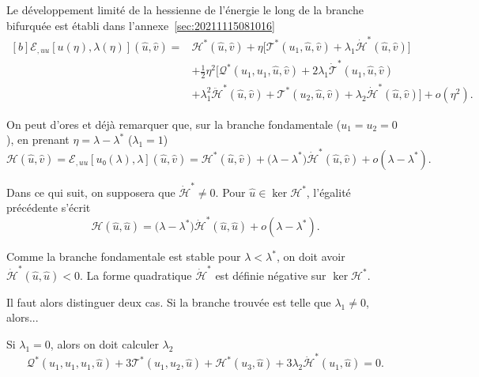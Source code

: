 \documentclass[12pt, final]{amsart}
\begin{document}
Le développement limité de la hessienne de l'énergie le long de la
branche bifurquée est établi dans l'annexe~\ref{sec:20211115081016}
\begin{equation}
  \label{eq:20211115082025}
  \begin{aligned}[b]
    ℰ_{,uu}[u(η), \lambda(η)](\hat{u}, \hat{v})
    ={}&\mathcal H^\ast(\hat{u}, \hat{v})
    +η\bigl[\mathcal T^\ast(u_1, \hat{u}, \hat{v})
    +\lambda_1\dot{\mathcal H}^\ast(\hat{u}, \hat{v})\bigr]\\
    &+\tfrac12η^2\bigl[\mathcal Q^\ast(u_1, u_1, \hat{u}, \hat{v})
    +2\lambda_1\dot{\mathcal T}^\ast(u_1, \hat{u}, \hat{v})\\
    &+\lambda_1^2\ddot{\mathcal H}^\ast(\hat{u}, \hat{v})
    +\mathcal T^\ast(u_2, \hat{u}, \hat{v})
    +\lambda_2\dot{\mathcal H}^\ast(\hat{u}, \hat{v})\bigr]+o(η^2).
  \end{aligned}
\end{equation}

On peut d'ores et déjà remarquer que, sur la branche fondamentale
(\(u_1=u_2=0\)), en prenant \(η=\lambda-\lambda^\ast\) (\(\lambda_1=1\))
\begin{equation}
  \mathcal H(\hat{u}, \hat{v})
  =ℰ_{,uu}[u₀(\lambda), \lambda](\hat{u}, \hat{v})
  =\mathcal H^\ast(\hat{u}, \hat{v})
  +\bigl(\lambda-\lambda^\ast\bigr)\dot{\mathcal H}^\ast(\hat{u}, \hat{v})
  +o(\lambda-\lambda^\ast).
\end{equation}

Dans ce qui suit, on supposera que \(\dot{\mathcal H}^\ast\neq 0\). Pour
\(\hat{u}\in\ker\mathcal H^\ast\), l'égalité précédente s'écrit
\begin{equation}
  \mathcal H(\hat{u}, \hat{u})
  =\bigl(\lambda-\lambda^\ast\bigr)\dot{\mathcal H}^\ast(\hat{u}, \hat{u})
  +o(\lambda-\lambda^\ast).
\end{equation}

Comme la branche fondamentale est stable pour \(\lambda<\lambda^\ast\), on doit
avoir \(\dot{\mathcal H}^\ast(\hat{u}, \hat{u})<0\). La forme quadratique
\(\dot{\mathcal H}^\ast\) est définie négative sur \(\ker\mathcal H^\ast\).


Il faut alors distinguer deux cas. Si la branche trouvée est telle que
\(\lambda_1\neq0\), alors...

Si \(\lambda_1=0\), alors on doit calculer \(\lambda_2\)
\begin{equation}
  \mathcal Q^\ast(u_1, u_1, u_1, \hat{u})
  +3\mathcal T^\ast(u_1, u_2, \hat{u})+\mathcal H^\ast(u_3, \hat{u})
  +3\lambda_2\dot{\mathcal H}^\ast(u_1, \hat{u})=0.
\end{equation}
\end{document}
